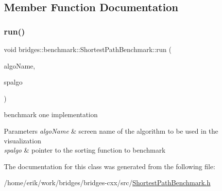 \subsection{Member Function Documentation}
\mbox{\label{classbridges_1_1benchmark_1_1_shortest_path_benchmark_a012285a17bb34b443265a9962ef4d3c2}} 
\subsubsection{\texorpdfstring{run()}{run()}}
{\footnotesize\ttfamily void bridges\+::benchmark\+::\+Shortest\+Path\+Benchmark\+::run (\begin{DoxyParamCaption}\item[{std\+::string}]{algo\+Name,  }\item[{void($\ast$)(const \hyperlink{classbridges_1_1datastructure_1_1_graph_adj_list}{Graph\+Adj\+List}$<$ int, \hyperlink{classbridges_1_1dataset_1_1_o_s_m_vertex}{O\+S\+M\+Vertex}, double $>$ \&gr, int source, std\+::unordered\+\_\+map$<$ int, double $>$ \&distance, std\+::unordered\+\_\+map$<$ int, int $>$ \&parent)}]{spalgo }\end{DoxyParamCaption})\hspace{0.3cm}{\ttfamily [inline]}}



benchmark one implementation 


\begin{DoxyParams}{Parameters}
{\em algo\+Name} & screen name of the algorithm to be used in the visualization \\
\hline
{\em spalgo} & pointer to the sorting function to benchmark \\
\hline
\end{DoxyParams}


The documentation for this class was generated from the following file\+:\begin{DoxyCompactItemize}
\item 
/home/erik/work/bridges/bridges-\/cxx/src/\hyperlink{_shortest_path_benchmark_8h}{Shortest\+Path\+Benchmark.\+h}\end{DoxyCompactItemize}
